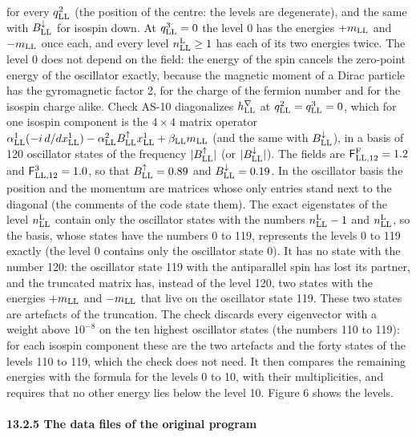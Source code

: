 \documentclass[
  10pt,
]{article}
\begin{document}
for every \(q^2_{\rm LL}\) (the position of the centre: the levels are
degenerate), and the same with \(B^\downarrow_{\rm LL}\) for isospin
down. At \(q^3_{\rm LL}=0\) the level 0 has the energies \(+m_{\rm LL}\)
and \(-m_{\rm LL}\) once each, and every level
\(n^{\rm L}_{\rm LL}\ge1\) has each of its two energies twice. The level
0 does not depend on the field: the energy of the spin cancels the
zero-point energy of the oscillator exactly, because the magnetic moment
of a Dirac particle has the gyromagnetic factor 2, for the charge of the
fermion number and for the isospin charge alike. Check AS-10
diagonalizes \(h^\nabla_{\rm LL}\) at \(q^2_{\rm LL}=q^3_{\rm LL}=0\),
which for one isospin component is the \(4\times4\) matrix operator
\(\alpha^1_{\rm LL}(-i\,d/dx^1_{\rm LL})-\alpha^2_{\rm LL}B^\uparrow_{\rm LL}x^1_{\rm LL}+\beta_{\rm LL}m_{\rm LL}\)
(and the same with \(B^\downarrow_{\rm LL}\)), in a basis of 120
oscillator states of the frequency \(\lvert B^\uparrow_{\rm LL}\rvert\)
(or \(\lvert B^\downarrow_{\rm LL}\rvert\)). The fields are
\(\mathsf F^{\rm F}_{{\rm LL},12}=1.2\) and
\(\mathsf F^3_{{\rm LL},12}=1.0\), so that \(B^\uparrow_{\rm LL}=0.89\)
and \(B^\downarrow_{\rm LL}=0.19\). In the oscillator basis the position
and the momentum are matrices whose only entries stand next to the
diagonal (the comments of the code state them). The exact eigenstates of
the level \(n^{\rm L}_{\rm LL}\) contain only the oscillator states with
the numbers \(n^{\rm L}_{\rm LL}-1\) and \(n^{\rm L}_{\rm LL}\), so the
basis, whose states have the numbers 0 to 119, represents the levels 0
to 119 exactly (the level 0 contains only the oscillator state 0). It
has no state with the number 120: the oscillator state 119 with the
antiparallel spin has lost its partner, and the truncated matrix has,
instead of the level 120, two states with the energies \(+m_{\rm LL}\)
and \(-m_{\rm LL}\) that live on the oscillator state 119. These two
states are artefacts of the truncation. The check discards every
eigenvector with a weight above \(10^{-8}\) on the ten highest
oscillator states (the numbers 110 to 119): for each isospin component
these are the two artefacts and the forty states of the levels 110 to
119, which the check does not need. It then compares the remaining
energies with the formula for the levels 0 to 10, with their
multiplicities, and requires that no other energy lies below the level
10. Figure 6 shows the levels.

\hypertarget{the-data-files-of-the-original-program}{%
\paragraph{13.2.5 The data files of the original
program}\label{the-data-files-of-the-original-program}}
\end{document}
